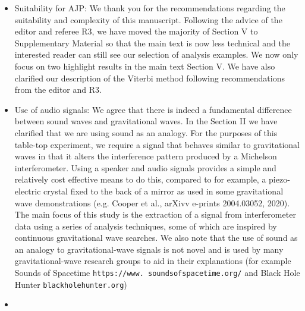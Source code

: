 \documentclass{article}
\newcommand{\han}{\textcolor{orange}}
\newcommand{\jam}{\textcolor{magenta}}
\begin{document}
\begin{itemize}
\item Suitability for AJP: We thank you for the recommendations regarding the suitability and complexity of this manuscript. Following the advice of the editor and referee R3, we have moved the majority of Section V to Supplementary Material so that the main text is now less technical and the interested reader can still see our selection of analysis examples. We now only focus on two highlight results in the main text Section V. We have also clarified our description of the Viterbi method following recommendations from the editor and R3. 
\item Use of audio signals: We agree that there is indeed a fundamental difference between sound waves and gravitational waves. In the Section II we have clarified that we are using sound as an analogy. For the purposes of this table-top experiment, we require a signal that behaves similar to gravitational waves in that it alters the interference pattern produced by a Michelson interferometer. Using a speaker and audio signals provides a simple and relatively cost effective means to do this, compared to for example, a piezo-electric crystal fixed to the back of a mirror as used in some gravitational wave demonstrations (e.g. Cooper et al., arXivv e-prints 2004.03052, 2020). The main focus of this study is the extraction of a signal from interferometer data using a series of analysis techniques, some of which are inspired by continuous gravitational wave searches. We also note that the use of sound as an analogy to gravitational-wave signals is not novel and is used by many gravitational-wave research groups to aid in their explanations (for example Sounds of Spacetime \texttt{https://www.
soundsofspacetime.org/} and Black Hole Hunter \texttt{blackholehunter.org})
\item[]

\end{itemize}
\end{document}
